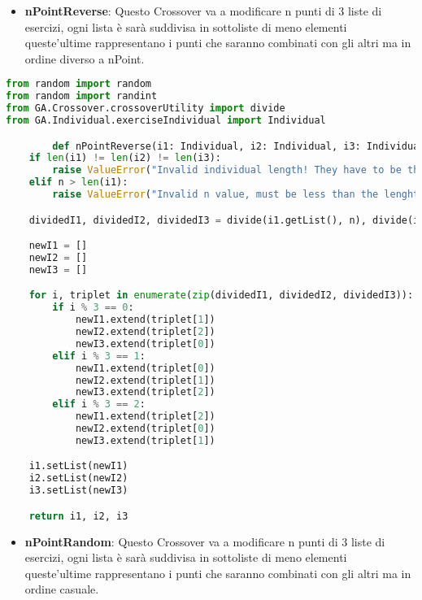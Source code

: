 \documentclass{article}
\begin{document}
\pagebreak

\begin{itemize}
\item\textbf{nPointReverse}: Questo Crossover va a modificare n punti di 3 liste di esercizi, ogni lista è sarà suddivisa in sottoliste di meno elementi queste'ultime rappresentano i punti che saranno combinati con gli altri ma in ordine diverso a nPoint.
\end{itemize}

\begin{lstlisting}[language=Python, breaklines, no caption]
from random import random
from random import randint
from GA.Crossover.crossoverUtility import divide
from GA.Individual.exerciseIndividual import Individual

        def nPointReverse(i1: Individual, i2: Individual, i3: Individual, n: int) -> tuple[Individual, Individual, Individual]:
    if len(i1) != len(i2) != len(i3):
        raise ValueError("Invalid individual length! They have to be the same.")
    elif n > len(i1):
        raise ValueError("Invalid n value, must be less than the lenght of the individual!")

    dividedI1, dividedI2, dividedI3 = divide(i1.getList(), n), divide(i2.getList(), n), divide(i3.getList(), n)

    newI1 = []
    newI2 = []
    newI3 = []

    for i, triplet in enumerate(zip(dividedI1, dividedI2, dividedI3)):
        if i % 3 == 0:
            newI1.extend(triplet[1])
            newI2.extend(triplet[2])
            newI3.extend(triplet[0])
        elif i % 3 == 1:
            newI1.extend(triplet[0])
            newI2.extend(triplet[1])
            newI3.extend(triplet[2])
        elif i % 3 == 2:
            newI1.extend(triplet[2])
            newI2.extend(triplet[0])
            newI3.extend(triplet[1])

    i1.setList(newI1)
    i2.setList(newI2)
    i3.setList(newI3)

    return i1, i2, i3
        \end{lstlisting}

        \pagebreak

\begin{itemize}
\item\textbf{nPointRandom}: Questo Crossover va a modificare n punti di 3 liste di esercizi, ogni lista è sarà suddivisa in sottoliste di meno elementi queste'ultime rappresentano i punti che saranno combinati con gli altri ma in ordine casuale.
\end{itemize}
\end{document}
